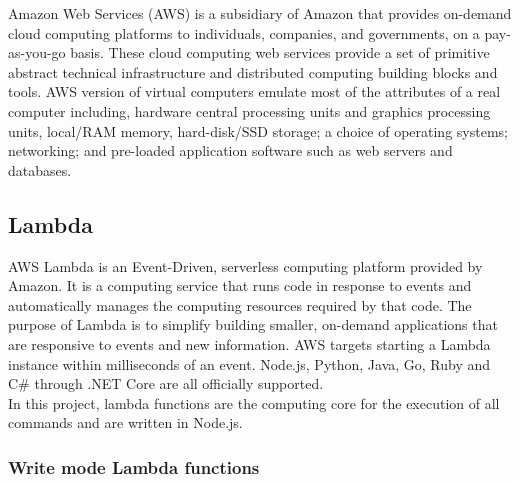Amazon Web Services (AWS) is a subsidiary of Amazon that provides on-demand cloud computing platforms to individuals, companies, and governments, on a pay-as-you-go basis. These cloud computing web services provide a set of primitive abstract technical infrastructure and distributed computing building blocks and tools. AWS version of virtual computers emulate most of the attributes of a real computer including, hardware central processing units and graphics processing units, local/RAM memory, hard-disk/SSD storage; a choice of operating systems; networking; and pre-loaded application software such as web servers and databases.

\subsection{Lambda}
AWS Lambda is an Event-Driven, serverless computing platform provided by Amazon. It is a computing service that runs code in response to events and automatically manages the computing resources required by that code. The purpose of Lambda is to simplify building smaller, on-demand applications that are responsive to events and new information. AWS targets starting a Lambda instance within milliseconds of an event. Node.js, Python, Java, Go, Ruby and C\# through .NET Core are all officially supported.\\

In this project, lambda functions are the computing core for the execution of all commands and are written in Node.js.

\subsubsection{Write mode Lambda functions}
